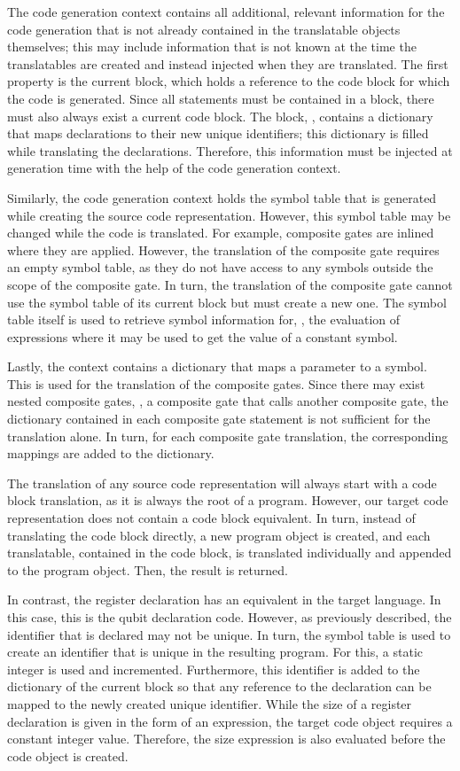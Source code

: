 The code generation context contains all additional, relevant information for the code generation that is not already contained in the translatable objects themselves; this may include information that is not known at the time the translatables are created and instead injected when they are translated. The first property is the current block, which holds a reference to the code block for which the code is generated. Since all statements must be contained in a block, there must also always exist a current code block. The block, \eg, contains a dictionary that maps declarations to their new unique identifiers; this dictionary is filled while translating the declarations. Therefore, this information must be injected at generation time with the help of the code generation context. 

Similarly, the code generation context holds the symbol table that is generated while creating the source code representation. However, this symbol table may be changed while the code is translated. For example, composite gates are inlined where they are applied. However, the translation of the composite gate requires an empty symbol table, as they do not have access to any symbols outside the scope of the composite gate. In turn, the translation of the composite gate cannot use the symbol table of its current block but must create a new one. The symbol table itself is used to retrieve symbol information for, \eg, the evaluation of expressions where it may be used to get the value of a constant symbol.

Lastly, the context contains a dictionary that maps a parameter to a symbol. This is used for the translation of the composite gates. Since there may exist nested composite gates, \ie, a composite gate that calls another composite gate, the dictionary contained in each composite gate statement is not sufficient for the translation alone. In turn, for each composite gate translation, the corresponding mappings are added to the dictionary.

The translation of any source code representation will always start with a code block translation, as it is always the root of a program. However, our target code representation does not contain a code block equivalent. In turn, instead of translating the code block directly, a new program object is created, and each translatable, contained in the code block, is translated individually and appended to the program object. Then, the result is returned.

In contrast, the register declaration has an equivalent in the target language. In this case, this is the qubit declaration code. However, as previously described, the identifier that is declared may not be unique. In turn, the symbol table is used to create an identifier that is unique in the resulting program. For this, a static integer is used and incremented. Furthermore, this identifier is added to the dictionary of the current block so that any reference to the declaration can be mapped to the newly created unique identifier. While the size of a register declaration is given in the form of an expression, the target code object requires a constant integer value. Therefore, the size expression is also evaluated before the code object is created. 

